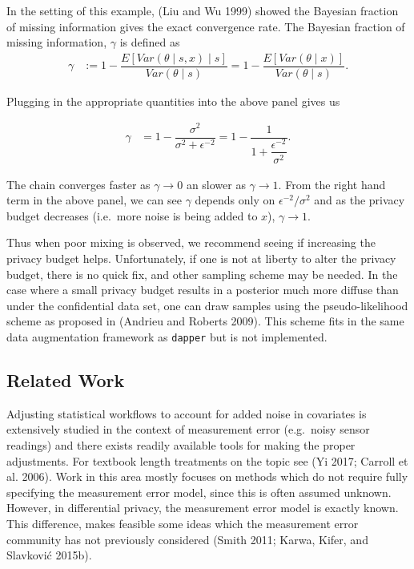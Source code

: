 In the setting of this example, (Liu and Wu 1999) showed the Bayesian fraction of missing information
gives the exact convergence rate. The Bayesian fraction of missing information, \(\gamma\) is
defined as
\begin{align*}
\gamma &:= 1 - \dfrac{E[Var(\theta \mid s, x) \mid s]}{Var(\theta \mid s)} = 1 - \dfrac{E[Var(\theta \mid x)]}{Var(\theta \mid s)}.
\end{align*}

Plugging in the appropriate quantities into the above panel gives us

\begin{align*}
\gamma &= 1 - \dfrac{\sigma^2}{\sigma^2 + \epsilon^{-2}} = 1 - \dfrac{1}{1 + \dfrac{\epsilon^{-2}}{\sigma^2}}.
\end{align*}

The chain converges faster as \(\gamma \to 0\) an slower as \(\gamma \to 1\).
From the right hand term in the above panel, we can see \(\gamma\)
depends only on \(\epsilon^{-2}/\sigma^2\) and as the privacy budget decreases (i.e.~more noise is being added to \(x\)),
\(\gamma \to 1\).

Thus when poor mixing is observed, we recommend seeing if increasing the privacy
budget helps. Unfortunately, if one is not at liberty to alter the privacy budget,
there is no quick fix, and other sampling scheme may be needed.
In the case where a small privacy budget results
in a posterior much more diffuse than under the confidential data set, one
can draw samples using the pseudo-likelihood scheme as proposed in (Andrieu and Roberts 2009). This
scheme fits in the same data augmentation framework as \texttt{dapper} but is not implemented.

\hypertarget{related-work}{%
\subsection{Related Work}\label{related-work}}

Adjusting statistical workflows to account for added noise in covariates
is extensively studied in the context of measurement error (e.g.~noisy sensor readings)
and there exists readily available tools for making the proper adjustments.
For textbook length treatments on the topic see (Yi 2017; Carroll et al. 2006).
Work in this area mostly focuses on methods which do not require fully specifying the
measurement error model, since this is often assumed unknown.
However, in differential privacy, the measurement error model is exactly known.
This difference, makes feasible some ideas which the measurement
error community has not previously considered (Smith 2011; Karwa, Kifer, and Slavković 2015b).

